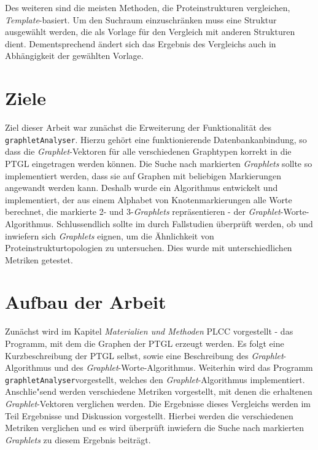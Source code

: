 \documentclass{report}
\begin{document}
Des weiteren sind die meisten Methoden, die Proteinstrukturen vergleichen, \textit{Template}-basiert. Um den Suchraum einzuschr\"anken muss eine Struktur ausgew\"ahlt werden, die als Vorlage f\"ur den Vergleich mit anderen Strukturen dient. Dementsprechend \"andert sich das Ergebnis des Vergleichs auch in Abh\"angigkeit der gew\"ahlten Vorlage.



\section{Ziele}

Ziel dieser Arbeit war zun\"achst die Erweiterung der Funktionalit\"at des \texttt{graphletAnalyser}. Hierzu geh\"ort eine funktionierende Datenbankanbindung, so dass die \textit{Graphlet}-Vektoren f\"ur alle verschiedenen Graphtypen korrekt in die PTGL eingetragen werden k\"onnen.
Die Suche nach markierten \textit{Graphlets} sollte so implementiert werden, dass sie auf Graphen mit beliebigen Markierungen angewandt werden kann. Deshalb wurde ein Algorithmus entwickelt und implementiert, der aus einem Alphabet von Knotenmarkierungen alle Worte berechnet, die markierte  2- und 3-\textit{Graphlets} repr\"asentieren - der \textit{Graphlet}-Worte-Algorithmus.
Schlussendlich sollte im durch Fallstudien \"uberpr\"uft werden, ob und inwiefern sich \textit{Graphlets} eignen, um die \"Ahnlichkeit von Proteinstrukturtopologien zu untersuchen. Dies wurde mit unterschiedlichen Metriken getestet.

\section{Aufbau der Arbeit}

Zun\"achst wird im Kapitel \emph{Materialien und Methoden} PLCC vorgestellt - das Programm, mit dem die Graphen der PTGL erzeugt werden.
Es folgt eine Kurzbeschreibung der PTGL selbst, sowie eine Beschreibung des \textit{Graphlet}-Algorithmus und des \textit{Graphlet}-Worte-Algorithmus.
Weiterhin wird das Programm \texttt{graphletAnalyser}vorgestellt, welches den \textit{Graphlet}-Algorithmus implementiert.
Anschlie"send werden verschiedene Metriken vorgestellt, mit denen die erhaltenen \textit{Graphlet}-Vektoren verglichen werden.
Die Ergebnisse dieses Vergleichs werden im Teil Ergebnisse und Diskussion vorgestellt. Hierbei werden die verschiedenen Metriken verglichen und es wird \"uberpr\"uft inwiefern die Suche nach markierten \textit{Graphlets} zu diesem Ergebnis beitr\"agt.
\end{document}
